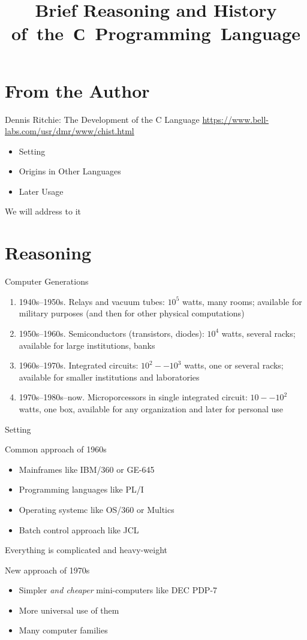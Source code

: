 \documentclass[xetex,aspectratio=149]{beamer}
\title{Brief Reasoning and History of~the~С~Programming~Language}
\begin{document}
\hello

\section{From the Author}

\begin{frame}{Dennis Ritchie: The Development of the C Language}
	\url{https://www.bell-labs.com/usr/dmr/www/chist.html}
	\begin{itemize}
		\item Setting
		\item Origins in Other Languages
		\item Later Usage
	\end{itemize}
	We will address to it
\end{frame}

\section{Reasoning}

\begin{frame}{Computer Generations}
	\begin{enumerate}
		\item 1940s--1950s. Relays and vacuum tubes: $10^5$ watts, many rooms; available for military purposes (and then for other physical computations)
		\item 1950s--1960s. Semiconductors (transistors, diodes): $10^4$ watts, several racks; available for large institutions, banks
		\item 1960s--1970s. Integrated circuits: $10^2 -- 10^3$ watts, one or several racks; available for smaller institutions and laboratories
		\item 1970s--1980s--now. Microporcessors in single integrated circuit: $10 -- 10^2$ watts,
		one box, available for any organization and later for personal use
	\end{enumerate}
\end{frame}

\begin{frame}{Setting}
	\begin{block}{Common approach of 1960s}
		\begin{itemize}
			\item Mainframes like IBM/360 or GE-645
			\item Programming languages like PL/I
			\item Operating systemc like OS/360 or Multics
			\item Batch control approach like JCL
		\end{itemize}
		Everything is complicated and heavy-weight
	\end{block}
\pause
	\begin{block}{New approach of 1970s}
	\begin{itemize}
		\item Simpler \emph{and cheaper} mini-computers like DEC PDP-7
		\item More universal use of them
		\item Many computer families
	\end{itemize}
\end{block}
\end{frame}
\end{document}
